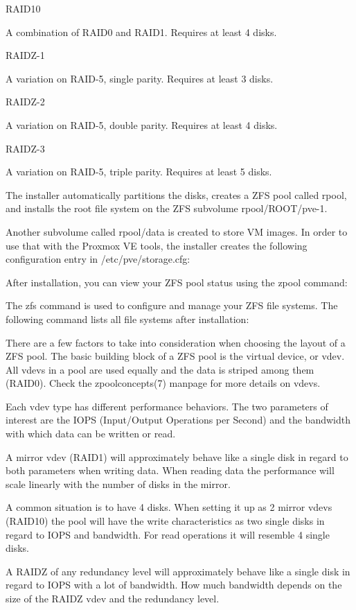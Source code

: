 RAID10

A combination of RAID0 and RAID1. Requires at least 4 disks.

RAIDZ-1

A variation on RAID-5, single parity. Requires at least 3 disks.

RAIDZ-2

A variation on RAID-5, double parity. Requires at least 4 disks.

RAIDZ-3

A variation on RAID-5, triple parity. Requires at least 5 disks.

The installer automatically partitions the disks, creates a ZFS pool called rpool, and installs the root file system on the ZFS subvolume rpool/ROOT/pve-1.

Another subvolume called rpool/data is created to store VM images. In order to use that with the Proxmox VE tools, the installer creates the following configuration entry in /etc/pve/storage.cfg:

After installation, you can view your ZFS pool status using the zpool command:

The zfs command is used to configure and manage your ZFS file systems. The following command lists all file systems after installation:

There are a few factors to take into consideration when choosing the layout of a ZFS pool. The basic building block of a ZFS pool is the virtual device, or vdev. All vdevs in a pool are used equally and the data is striped among them (RAID0). Check the zpoolconcepts(7) manpage for more details on vdevs.

Each vdev type has different performance behaviors. The two parameters of interest are the IOPS (Input/Output Operations per Second) and the bandwidth with which data can be written or read.

A mirror vdev (RAID1) will approximately behave like a single disk in regard to both parameters when writing data. When reading data the performance will scale linearly with the number of disks in the mirror.

A common situation is to have 4 disks. When setting it up as 2 mirror vdevs (RAID10) the pool will have the write characteristics as two single disks in regard to IOPS and bandwidth. For read operations it will resemble 4 single disks.

A RAIDZ of any redundancy level will approximately behave like a single disk in regard to IOPS with a lot of bandwidth. How much bandwidth depends on the size of the RAIDZ vdev and the redundancy level.

